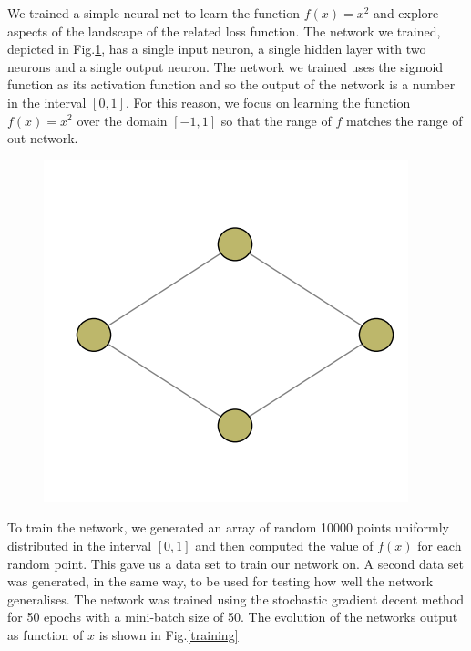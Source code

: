 \documentclass[12pt,a4paper]{article}
\begin{document}
We trained a simple neural net to learn the function $f(x)=x^2$ and explore aspects of the landscape of the related loss function. The network we trained, depicted in Fig.\ref{DiamondNet}, has a single input neuron, a single hidden layer with two neurons and a single output neuron. The network we trained uses the sigmoid function as its activation function and so the output of the network is a number in the interval $[0,1]$. For this reason, we focus on learning the function $f(x)=x^2$ over the domain $[-1,1]$ so that the range of $f$ matches the range of out network.

\begin{figure}
\center
\includegraphics[scale=0.5]{Images/net_1_2_1.png}
\caption{}
\label{DiamondNet}
\end{figure}


To train the network, we generated an array of random 10000 points uniformly distributed in the interval $[0,1]$ and then computed the value of $f(x)$ for each random point. This gave us a data set to train our network on. A second data set was generated, in the same way, to be used for testing how well the network generalises. The network was trained using the stochastic gradient decent method for 50 epochs with a mini-batch size of 50. The evolution of the networks output as function of $x$ is shown in Fig.\ref{training}
\end{document}

